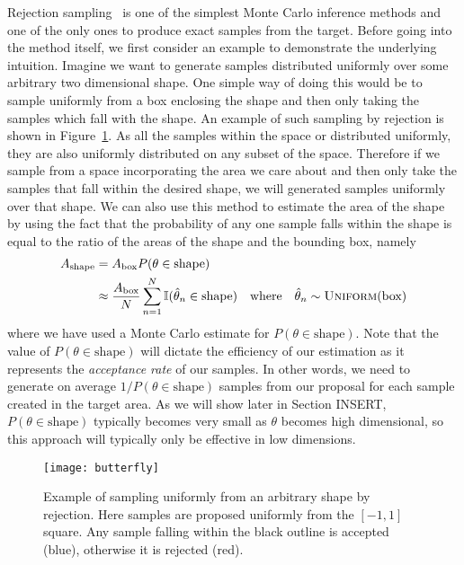 Rejection sampling~\citep{robert2004monte} is one of the simplest Monte Carlo 
inference methods and one of the only ones to produce exact samples from 
the target.  Before going into the method itself, we first consider an example to
demonstrate the underlying intuition.  Imagine we want to generate samples 
distributed uniformly over some arbitrary two dimensional shape.  One simple
way of doing this would be to sample uniformly from a box enclosing the
shape and then only taking the samples which fall with the shape.
An example of such sampling by rejection is shown in Figure~\ref{fig:inf:rej-butt}.
As all the samples within the space or distributed uniformly, they are also
uniformly distributed on any subset of the space.  Therefore if we sample
from a space incorporating the area we care about and then only take the samples
that fall within the desired shape, we will generated samples uniformly over
that shape. We can also use this method to estimate the area of the shape by using
the fact that the probability of any one sample falls within the shape is equal to
the ratio of the areas of the shape and the bounding box, namely
\begin{align}
A_{\text{shape}} &= A_{\text{box}}	P(\theta \in \text{shape}) \\
&\approx \frac{A_{\mathrm{box}}}{N} \sum_{n=1}^{N} \mathbb{I} (\hat{\theta}_n \in \text{shape})
\quad \text{where} \quad \hat{\theta}_n \sim \textsc{Uniform}(\text{box})
\end{align}
where we have used a Monte Carlo estimate for $P(\theta \in \text{shape})$.
Note that the value of $P(\theta \in \text{shape})$ will
dictate the efficiency of our estimation as it represents the \emph{acceptance rate}
of our samples.  In other words, we need to generate on average $1/P(\theta \in \text{shape})$
samples from our proposal for each sample created in the target area.  As we
will show later in Section INSERT, $P(\theta \in \text{shape})$ typically becomes very
small as $\theta$ becomes high dimensional, so this approach will typically only
be effective in low dimensions.

\begin{figure}[t]
	\centering
	\texttt{[image: butterfly]}
	\caption{Example of sampling uniformly from an arbitrary shape by 
		rejection.  Here samples are proposed uniformly from the $[-1,1]$
		square.  Any sample falling within the black outline is accepted 
		(blue), otherwise it is rejected (red).  \label{fig:inf:rej-butt}}
\end{figure}

